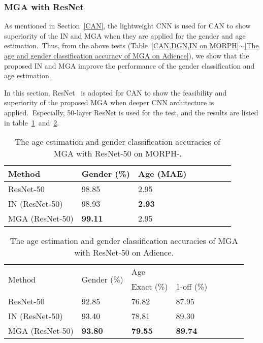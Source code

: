 \documentclass[10pt,twocolumn,letterpaper]{article}
\begin{document}
\subsubsection{MGA with ResNet}
As mentioned in Section~\ref{CAN}, the lightweight CNN is used for CAN to show superiority of the IN and MGA when they are applied for the gender and age estimation.~Thus, from the above tests (Table~\ref{CAN,DGN,IN on MORPH}$\sim$\ref{The age and gender classification accuracy of MGA on Adience}), we show that the proposed IN and MGA improve the performance of the gender classification and age estimation.

In this section, ResNet~\cite{DBLP:journals/corr/HeZRS15} is adopted for CAN to show the feasibility and superiority of the proposed MGA when deeper CNN architecture is applied.~Especially, 50-layer ResNet is used for the test, and the results are listed in table~\ref{Resnet50 on MORPH}~and~\ref{Resnet50 on Adience}.

\begin{table}[!h]
\centering
\caption{The age estimation and gender classification accuracies of MGA with ResNet-50 on MORPH-.}
\label{Resnet50 on MORPH}

\begin{adjustbox}{width=0.45\textwidth}
\begin{tabular}{p{4cm}lllllll}
\hline
Method & Gender (\%) & Age (MAE) \\ \hline
ResNet-50         & 98.85   &  2.95       \\
IN (ResNet-50)    &  98.93  & \textbf{2.93}        \\
MGA (ResNet-50)   &  \textbf{99.11}  & 2.95        \\ \hline

\end{tabular}
\end{adjustbox}
\end{table}

\begin{table}[!h]
\centering
\caption{The age estimation and gender classification accuracies of MGA with ResNet-50 on Adience.}
\label{Resnet50 on Adience}

\begin{adjustbox}{width=0.45\textwidth}
\begin{tabular}{p{3.5cm}lllllll}
\hline
\multirow{2}{*}{Method} & \multirow{2}{*}{Gender (\%)} & \multicolumn{2}{l}{Age} \\ \cline{3-4}
                        &       & Exact (\%)     & 1-off (\%)                  \\ \hline
ResNet-50                     &   92.85 &  76.82     &   87.95                     \\
IN (ResNet-50)                &    93.40 &  78.81    &   89.30                     \\
MGA (ResNet-50)               & \textbf{93.80}    &  \textbf{79.55}     & \textbf{89.74}    \\ \hline
\end{tabular}
\end{adjustbox}
\end{table}
\end{document}
